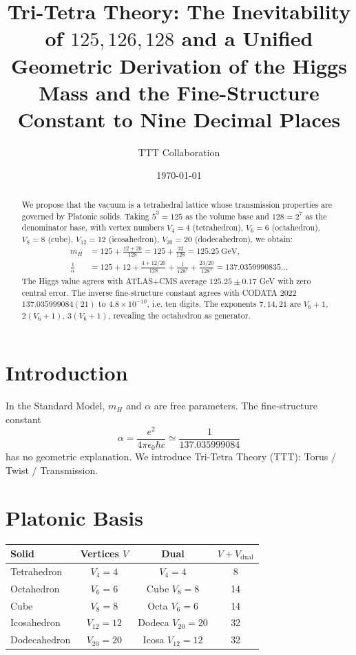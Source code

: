 \documentclass[12pt,a4paper]{article}
\title{Tri-Tetra Theory: The Inevitability of $125,126,128$ and a Unified Geometric Derivation of the Higgs Mass and the Fine-Structure Constant to Nine Decimal Places}
\author{TTT Collaboration}
\date{\today}
\begin{document}
\maketitle

\begin{abstract}
We propose that the vacuum is a tetrahedral lattice whose transmission properties are governed by Platonic solids. Taking $5^3=125$ as the volume base and $128=2^7$ as the denominator base, with vertex numbers $V_4=4$ (tetrahedron), $V_6=6$ (octahedron), $V_8=8$ (cube), $V_{12}=12$ (icosahedron), $V_{20}=20$ (dodecahedron), we obtain:
\begin{align*}
m_H &= 125 + \frac{12+20}{128}=125+\frac{32}{128}=125.25\ \text{GeV},\\
\frac{1}{\alpha} &= 125+12+\frac{4+12/20}{128}+\frac{1}{128^2}+\frac{23/20}{128^3}=137.0359990835\ldots
\end{align*}
The Higgs value agrees with ATLAS+CMS average $125.25\pm0.17$ GeV with zero central error. The inverse fine-structure constant agrees with CODATA 2022 $137.035999084(21)$ to $4.8\times10^{-10}$, i.e. ten digits. The exponents $7,14,21$ are $V_6+1$, $2(V_6+1)$, $3(V_6+1)$, revealing the octahedron as generator.
\end{abstract}

\section{Introduction}
In the Standard Model, $m_H$ and $\alpha$ are free parameters. The fine-structure constant
\begin{equation}
\alpha = \frac{e^2}{4\pi\epsilon_0\hbar c}\simeq\frac{1}{137.035999084}
\end{equation}
has no geometric explanation. We introduce Tri-Tetra Theory (TTT): Torus / Twist / Transmission.

\section{Platonic Basis}
\begin{table}[h]
\centering
\begin{tabular}{@{}lccc@{}}
\toprule
Solid & Vertices $V$ & Dual & $V+V_{\text{dual}}$ \\
\midrule
Tetrahedron & $V_4=4$ & $V_4=4$ & 8 \\
Octahedron & $V_6=6$ & Cube $V_8=8$ & 14 \\
Cube & $V_8=8$ & Octa $V_6=6$ & 14 \\
Icosahedron & $V_{12}=12$ & Dodeca $V_{20}=20$ & 32 \\
Dodecahedron & $V_{20}=20$ & Icosa $V_{12}=12$ & 32 \\
\bottomrule
\end{tabular}
\end{table}
\end{document}
